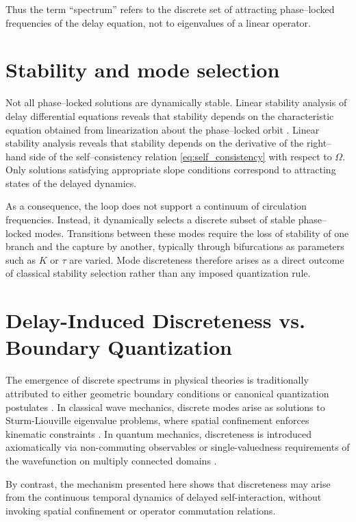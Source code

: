 \documentclass[pdflatex,sn-mathphys-num]{sn-jnl}
\begin{document}
        Thus the term ``spectrum'' refers to the discrete set of attracting phase--locked frequencies of the delay equation, not to eigenvalues of a linear operator.

    \section{Stability and mode selection}
        Not all phase--locked solutions are dynamically stable. Linear stability analysis of delay differential equations reveals that stability depends on the characteristic equation obtained from linearization about the phase--locked orbit \cite{Hale1993,Diekmann1995,Erneux2009}. Linear stability analysis reveals that stability depends on the derivative of the right--hand side of the self--consistency relation \ref{eq:self_consistency} with respect to $\Omega$. Only solutions satisfying appropriate slope conditions correspond to attracting states of the delayed dynamics.

        As a consequence, the loop does not support a continuum of circulation frequencies. Instead, it dynamically selects a discrete subset of stable phase--locked modes. Transitions between these modes require the loss of stability of one branch and the capture by another, typically through bifurcations as parameters such as $K$ or $\tau$ are varied. Mode discreteness therefore arises as a direct outcome of classical stability selection rather than any imposed quantization rule.

    \section{Delay-Induced Discreteness vs. Boundary Quantization}

        The emergence of discrete spectrums in physical theories is traditionally attributed to either geometric boundary conditions or canonical quantization postulates \cite{Zettl2005,Griffiths2018}.
        In classical wave mechanics, discrete modes arise as solutions to Sturm-Liouville eigenvalue problems, where spatial confinement enforces kinematic constraints \cite{Zettl2005}.
        In quantum mechanics, discreteness is introduced axiomatically via non-commuting observables or single-valuedness requirements of the wavefunction on multiply connected domains \cite{Griffiths2018}.

        By contrast, the mechanism presented here shows that discreteness may arise from the continuous temporal dynamics of delayed self-interaction, without invoking spatial confinement or operator commutation relations.
\end{document}
